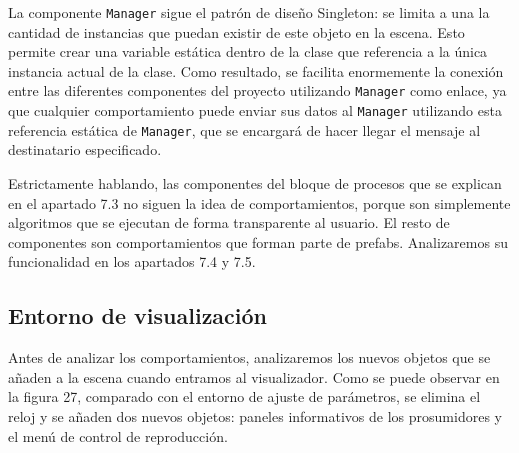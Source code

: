 \documentclass[12pt,a4paper,openright,oneside]{article}
\numberwithin{equation}{section}
\theoremstyle{definition}
\begin{document}
La componente \texttt{Manager} sigue el patrón de diseño Singleton: se limita a una la cantidad de instancias que puedan existir de este objeto en la escena. Esto permite crear una variable estática dentro de la clase que referencia a la única instancia actual de la clase. Como resultado, se facilita enormemente la conexión entre las diferentes componentes del proyecto utilizando \texttt{Manager} como enlace, ya que cualquier comportamiento puede enviar sus datos al \texttt{Manager} utilizando esta referencia estática de \texttt{Manager}, que se encargará de hacer llegar el mensaje al destinatario especificado.

Estrictamente hablando, las componentes del bloque de procesos que se explican en el apartado 7.3 no siguen la idea de comportamientos, porque son simplemente algoritmos que se ejecutan de forma transparente al usuario. El resto de componentes son comportamientos que forman parte de prefabs. Analizaremos su funcionalidad en los apartados 7.4 y 7.5.
\clearpage
\subsection{Entorno de visualización}

Antes de analizar los comportamientos, analizaremos los nuevos objetos que se añaden a la escena cuando entramos al visualizador. Como se puede observar en la figura 27, comparado con el entorno de ajuste de parámetros, se elimina el reloj y se añaden dos nuevos objetos: paneles informativos de los prosumidores y el menú de control de reproducción.
\end{document}
